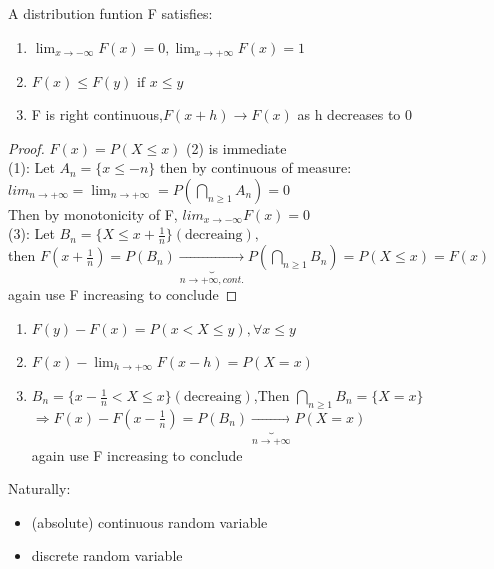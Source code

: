 \begin{lemma}[]{}
A distribution funtion F satisfies:
 \begin{enumerate}[label=\circled{\arabic*}] 
 \item $ \lim_{x\rightarrow-\infty}F(x)=0,\lim_{x\rightarrow+\infty}F(x)=1 $ 
 \item $ F(x)\leq F(y) \text{ if }x\leq y $ 
 \item F is right continuous,$ F(x+h)\rightarrow F(x) $ as h decreases to 0
 \end{enumerate}
\end{lemma}
\begin{proof}
   $ F(x)=P(X\leq x)$ (2) is immediate\\
   (1): Let $ A_n=\{x\leq -n\} $ then by continuous of measure:$ lim_{n\rightarrow+\infty}=\lim_{n\rightarrow+\infty}=P(\bigcap_{n\geq1}A_n)=0 $  
   \\Then by monotonicity of F, $ lim_{x\rightarrow-\infty}F(x)=0 $
   \\(3): Let $ B_n=\{X\leq x+\frac{1}{n}\}(\text{decreaing}), $\\ then $ F(x+\frac{1}{n})=P(B_n) \underbrace{\rightarrow}_{n\rightarrow+\infty,cont.}P(\bigcap_{n\geq1}B_n)=P(X\leq  x)=F(x) $ 
   \\again use F increasing to conclude 
\end{proof}
\begin{lemma}[]{}
 \begin{enumerate}[label=\circled{\arabic*}] 
 \item $F(y)-F(x)=P(x<X\leq y),\forall x\leq y$
 \item $ F(x)-\lim_{h\rightarrow+\infty}F(x-h)=P(X=x) $
 \item $ B_n=\{x-\frac{1}{n}<X\leq x\}(\text{decreaing}) $,Then $ \bigcap_{n\geq1}B_n=\{X=x\} $
 \\$\Rightarrow F(x)-F(x-\frac{1}{n})=P(B_n)\underbrace{\rightarrow}_{n\rightarrow+\infty}P(X=x)$ \\again use F increasing to conclude
    \end{enumerate}
\end{lemma}
Naturally: 
\begin{itemize}
\item (absolute) continuous random variable
\item discrete random variable
\end{itemize}
